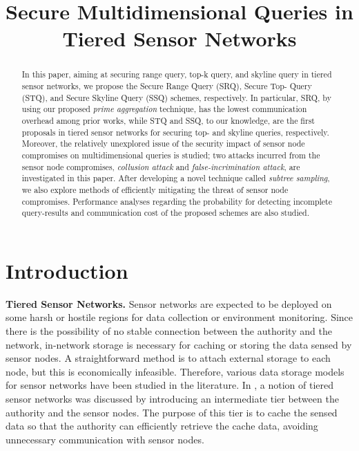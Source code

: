 \documentclass[conference]{IEEEtran}
\begin{document}
\title{Secure Multidimensional Queries in Tiered Sensor Networks}

\author{

}

\maketitle


\begin{abstract}
In this paper, aiming at securing range query, top-k query, and skyline query in tiered sensor networks, we propose the Secure Range Query (SRQ), Secure Top- Query (STQ), and Secure Skyline Query (SSQ) schemes, respectively. In particular, SRQ, by using our proposed \emph{prime aggregation} technique, has the lowest communication overhead among prior works, while STQ and SSQ, to our knowledge, are the first proposals in tiered sensor networks for securing top- and skyline queries, respectively. Moreover, the relatively unexplored issue of the security impact of sensor node compromises on multidimensional queries is studied; two attacks incurred from the sensor node compromises, \emph{collusion attack} and \emph{false-incrimination attack}, are investigated in this paper. After developing a novel technique called \emph{subtree sampling}, we also explore methods of efficiently mitigating the threat of sensor node compromises. Performance analyses regarding the probability for detecting incomplete query-results and communication cost of the proposed schemes are also studied.
\end{abstract}

\section{Introduction}\label{sec: Introduction}

\textbf{Tiered Sensor Networks.} Sensor networks are expected to be deployed on some harsh or hostile regions for data collection or environment monitoring. Since there is the possibility of no stable connection between the authority and the network, in-network storage is necessary for caching or storing the data sensed by sensor nodes. A straightforward method is to attach external storage to each node, but this is economically infeasible. Therefore, various data storage models for sensor networks have been studied in the literature. In \cite{rksegyy03,dglls05}, a notion of tiered sensor networks was discussed by introducing an intermediate tier between the authority and the sensor nodes. The purpose of this tier is to cache the sensed data so that the authority can efficiently retrieve the cache data, avoiding unnecessary communication with sensor nodes.
\end{document}
